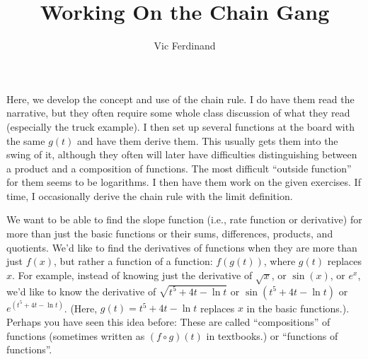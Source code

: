\documentclass{ximera}
\author{Vic Ferdinand}
\title{Working On the Chain Gang}
\begin{document}
\begin{abstract}
\end{abstract}
\maketitle


\begin{instructorIntro}
Here, we develop the concept and use of the chain rule.  I do have them read the narrative, but they often require some whole class discussion of what they read (especially the truck example).  I then set up several functions at the board with the same $g(t)$ and have them derive them. This usually gets them into the swing of it, although they often will later have difficulties distinguishing between a product and a composition of functions.  The most difficult ``outside function'' for them seems to be logarithms. I then have them work on the given exercises. If time, I occasionally derive the chain rule with the limit definition.  
\end{instructorIntro}


We want to be able to find the slope function (i.e., rate function or derivative) for more than just the basic functions or their sums, differences, products, and quotients.  We'd like to find the derivatives of functions when they are more than just $f(x)$, but rather a function of a function:  $f(g(t))$, where $g(t)$ replaces $x$.  For example, instead of knowing just the derivative of   $\sqrt{x}$, or  $\sin(x)$,  or  $e^x$, we'd like to know the derivative of  $\sqrt{t^5+4t-\ln t}$ or $\sin(t^5+4t-\ln t)$ or   $e^{(t^5+4t-\ln t)}$.  (Here, $g(t) = t^5 + 4t-\ln t$  replaces $x$ in the basic functions.).  Perhaps you have seen this idea before:  These are called ``compositions'' of functions (sometimes written as $(f \circ g)(t)$ in textbooks.) or ``functions of functions''.
\end{document}
